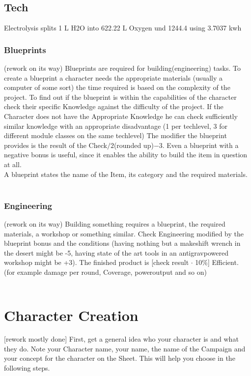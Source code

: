 \documentclass{article}
\begin{document}
    \subsection{Tech}
    Electrolysis splits 1 L H2O into 622.22 L Oxygen und 1244.4 using 3.7037 kwh\\
    \subsubsection{Blueprints}
(rework on its way)
    Blueprints are required for building(engineering) tasks. To create a blueprint a character needs the appropriate materials
    (usually a computer of some sort) the time required is based on the complexity of the project. To find out if the
    blueprint is within the capabilities of the character check their specific Knowledge against the difficulty of the
    project. If the Character does not have the Appropriate Knowledge he can check sufficiently similar knowledge with
    an appropriate disadvantage (1 per techlevel, 3 for different module classes on the same techlevel)
    The modifier the blueprint provides is the result of the Check\(/2\)(rounded up)\(-3\).
    Even a blueprint with a negative bonus is useful, since it enables the ability to build the item in question at all.\\
    A blueprint states the name of the Item, its category and the required materials.\\\\

    \subsubsection{Engineering}
(rework on its way)
    Building something requires a blueprint, the required materials, a workshop or something similar. Check Engineering
    modified by the blueprint bonus and the conditions (having nothing but a makeshift wrench in the desert might be -5, having state of the art
    tools in an antigravpowered workshop might be +3). The finished product is [check result \(\cdot\) 10\%] Efficient.
    (for example damage per round, Coverage, poweroutput and so on)\\\\


    \section{Character Creation}
    [rework mostly done]
    First, get a general idea who your character is and what they do. Note your Character name, your name, the name of the
    Campaign and your concept for the character on the Sheet. This will help you choose in the following steps.
\end{document}
